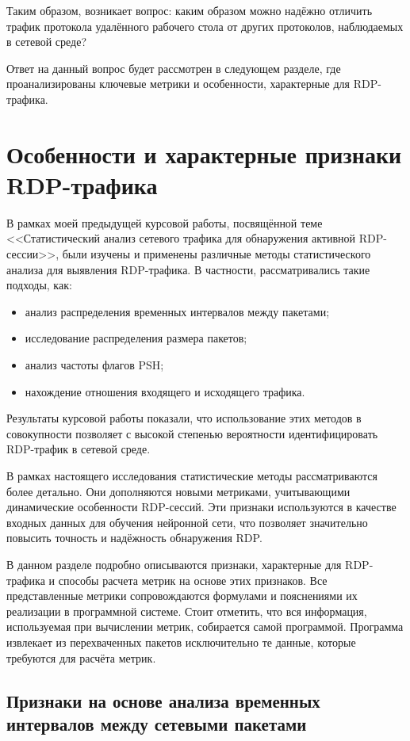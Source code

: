 \documentclass[spec, och, diploma]{SCWorks}
\begin{document}
Таким образом, возникает вопрос: каким образом можно надёжно отличить трафик протокола удалённого рабочего стола от других протоколов, наблюдаемых в сетевой среде?

Ответ на данный вопрос будет рассмотрен в следующем разделе, где проанализированы ключевые метрики и особенности, характерные для RDP-трафика.

\section{Особенности и характерные признаки RDP-трафика}

В рамках моей предыдущей курсовой работы, посвящённой теме <<Статистический анализ сетевого трафика для обнаружения активной RDP-сессии>>, 
были изучены и применены различные методы статистического анализа для выявления RDP-трафика. В частности, рассматривались такие подходы, как:  

\begin{itemize}
  \item анализ распределения временных интервалов между пакетами;  
  \item исследование распределения размера пакетов;  
  \item анализ частоты флагов PSH;  
  \item нахождение отношения входящего и исходящего трафика.  
\end{itemize}

Результаты курсовой работы показали, что использование этих методов в совокупности позволяет с высокой степенью вероятности идентифицировать 
RDP-трафик в сетевой среде.  


В рамках настоящего исследования статистические методы рассматриваются более детально. Они дополняются новыми метриками, 
учитывающими динамические особенности RDP-сессий. Эти признаки используются в качестве входных данных для обучения нейронной сети, что позволяет 
значительно повысить точность и надёжность обнаружения RDP.

В данном разделе подробно описываются признаки, характерные для RDP-трафика и способы расчета метрик на основе этих признаков.
Все представленные метрики сопровождаются формулами и пояснениями их реализации в программной системе. Стоит отметить, что вся информация, 
используемая при вычислении метрик, собирается самой программой. Программа извлекает из перехваченных пакетов исключительно те данные, которые 
требуются для расчёта метрик.

\subsection{Признаки на основе анализа временных интервалов между сетевыми пакетами}
\end{document}
